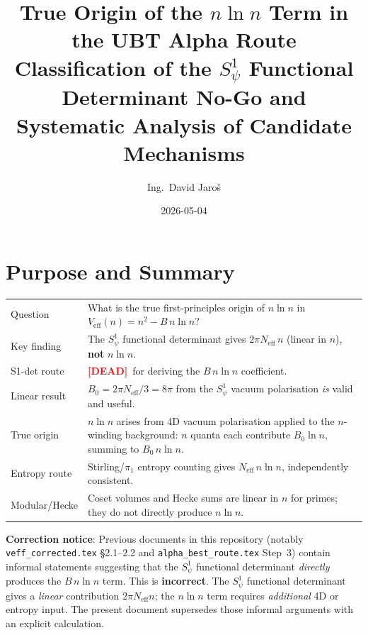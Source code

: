 \documentclass[12pt,a4paper]{article}
\title{\textbf{True Origin of the $n\ln n$ Term in the UBT Alpha Route}\\
         \large Classification of the $S^1_\psi$ Functional Determinant No-Go
         and Systematic Analysis of Candidate Mechanisms}
\author{Ing.\ David Jaro\v{s}}
\date{2026-05-04}
\theoremstyle{definition}
\theoremstyle{remark}
\newcommand{\Neff}{N_{\mathrm{eff}}}
\newcommand{\DEAD}{\textcolor{red}{\textbf{[DEAD]}}}
\begin{document}
  \maketitle
  \tableofcontents
  \newpage
\fi

\section{Purpose and Summary}
\label{sec:nlogn:purpose}

\begin{tcolorbox}[colback=blue!4!white, colframe=blue!50!black,
                  title=Executive Summary]
\begin{tabular}{ll}
Question        & What is the true first-principles origin of $n\ln n$ in
                  $V_\mathrm{eff}(n) = n^2 - B\,n\ln n$? \\[4pt]
Key finding     & The $S^1_\psi$ functional determinant gives $2\pi\Neff\,n$
                  (linear in $n$), \textbf{not} $n\ln n$. \\[4pt]
S1-det route    & \DEAD\ for deriving the $B\,n\ln n$ coefficient. \\[4pt]
Linear result   & $B_0 = 2\pi\Neff/3 = 8\pi$ from the $S^1_\psi$ vacuum
                  polarisation \emph{is} valid and useful. \\[4pt]
True origin     & $n\ln n$ arises from 4D vacuum polarisation applied to the
                  $n$-winding background: $n$ quanta each contribute
                  $B_0\ln n$, summing to $B_0\,n\ln n$. \\[4pt]
Entropy route   & Stirling/$\pi_1$ entropy counting gives $\Neff\,n\ln n$,
                  independently consistent. \\[4pt]
Modular/Hecke   & Coset volumes and Hecke sums are linear in $n$ for primes;
                  they do not directly produce $n\ln n$. \\
\end{tabular}
\end{tcolorbox}

\begin{warnbox}
\textbf{Correction notice}: Previous documents in this repository (notably
\texttt{veff\_corrected.tex} \S2.1--2.2 and \texttt{alpha\_best\_route.tex}
Step~3) contain informal statements suggesting that the $S^1_\psi$ functional
determinant \emph{directly} produces the $B\,n\ln n$ term.  This is
\textbf{incorrect}.  The $S^1_\psi$ functional determinant gives a
\emph{linear} contribution $2\pi\Neff n$; the $n\ln n$ term requires
\emph{additional} 4D or entropy input.  The present document supersedes those
informal arguments with an explicit calculation.
\end{warnbox}
\end{document}
